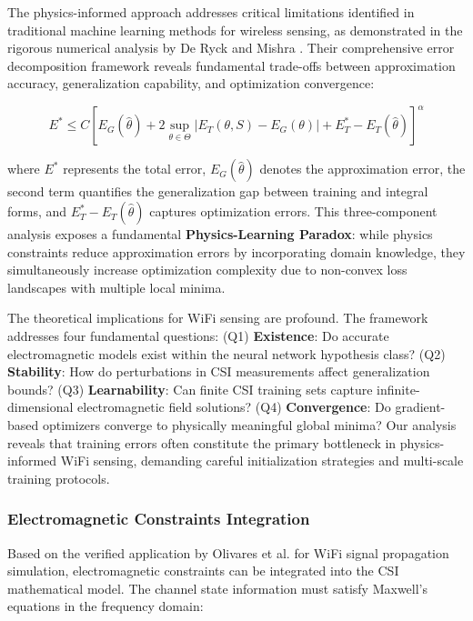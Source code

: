 \documentclass[journal]{IEEEtran}
\begin{document}
The physics-informed approach addresses critical limitations identified in traditional machine learning methods for wireless sensing, as demonstrated in the rigorous numerical analysis by De Ryck and Mishra \cite{de2024numerical}. Their comprehensive error decomposition framework reveals fundamental trade-offs between approximation accuracy, generalization capability, and optimization convergence:

\begin{equation}
E^* \leq C \left[ E_G(\hat{\theta}) + 2 \sup_{\theta \in \Theta} |E_T(\theta, S) - E_G(\theta)| + E_T^* - E_T(\hat{\theta}) \right]^{\alpha}
\label{eq:de_ryck_error_decomposition}
\end{equation}

where $E^*$ represents the total error, $E_G(\hat{\theta})$ denotes the approximation error, the second term quantifies the generalization gap between training and integral forms, and $E_T^* - E_T(\hat{\theta})$ captures optimization errors. This three-component analysis exposes a fundamental \textbf{Physics-Learning Paradox}: while physics constraints reduce approximation errors by incorporating domain knowledge, they simultaneously increase optimization complexity due to non-convex loss landscapes with multiple local minima.

The theoretical implications for WiFi sensing are profound. The framework addresses four fundamental questions: (Q1) \textbf{Existence}: Do accurate electromagnetic models exist within the neural network hypothesis class? (Q2) \textbf{Stability}: How do perturbations in CSI measurements affect generalization bounds? (Q3) \textbf{Learnability}: Can finite CSI training sets capture infinite-dimensional electromagnetic field solutions? (Q4) \textbf{Convergence}: Do gradient-based optimizers converge to physically meaningful global minima? Our analysis reveals that training errors often constitute the primary bottleneck in physics-informed WiFi sensing, demanding careful initialization strategies and multi-scale training protocols.

\subsubsection{Electromagnetic Constraints Integration}

Based on the verified application by Olivares et al. \cite{olivares2021applications} for WiFi signal propagation simulation, electromagnetic constraints can be integrated into the CSI mathematical model. The channel state information must satisfy Maxwell's equations in the frequency domain:
\end{document}
